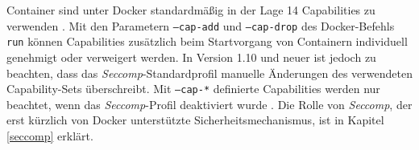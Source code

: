 \documentclass[../main.tex]{subfiles}
\begin{document}
			Container sind unter Docker standardmäßig in der Lage 14 Capabilities zu verwenden \cite{githubCapabilities}. Mit den Parametern \texttt{--cap-add} und \texttt{--cap-drop} des Docker-Befehls \texttt{run} können Capabilities zusätzlich beim Startvorgang von Containern individuell genehmigt oder verweigert werden. In Version 1.10 und neuer ist jedoch zu beachten, dass das \emph{Seccomp}-Standardprofil manuelle Änderungen des verwendeten Capability-Sets überschreibt. Mit \texttt{--cap-*} definierte Capabilities werden nur beachtet, wenn das \emph{Seccomp}-Profil deaktiviert wurde \cite{dockerRun}. Die Rolle von \emph{Seccomp}, der erst kürzlich von Docker unterstützte Sicherheitsmechanismus, ist in Kapitel \ref{seccomp} erklärt.






\end{document}
